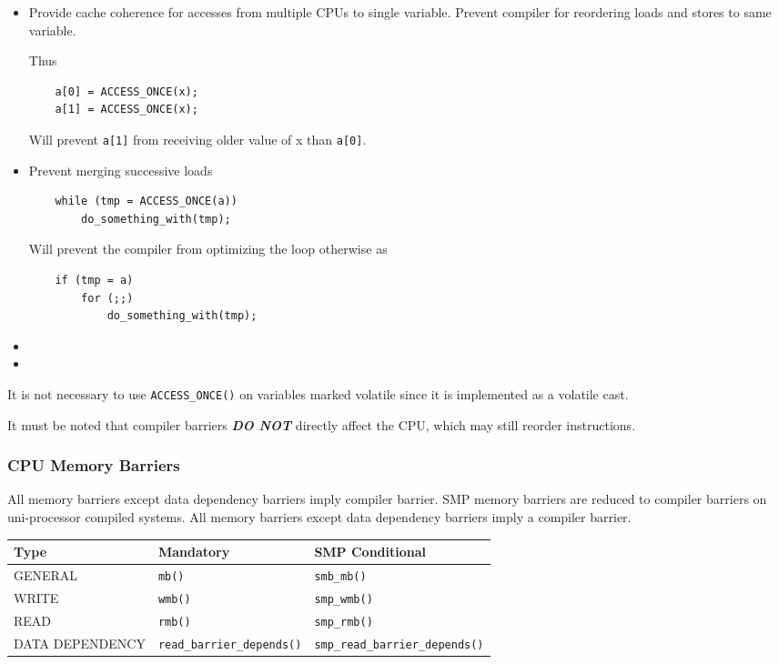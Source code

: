 \documentclass{article}
\begin{document}
\begin{itemize}
\item Provide cache coherence for accesses from multiple CPUs to
  single variable. Prevent compiler for reordering loads and stores to
  same variable.
  
  Thus
  \begin{lstlisting}
    a[0] = ACCESS_ONCE(x);
    a[1] = ACCESS_ONCE(x);
  \end{lstlisting}
  Will prevent \lstinline{a[1]} from receiving older value of x than
  \lstinline{a[0]}.

\item Prevent merging successive loads

  \begin{lstlisting}
    while (tmp = ACCESS_ONCE(a))
		do_something_with(tmp);
  \end{lstlisting}

  Will prevent the compiler from optimizing the loop otherwise as

  \begin{lstlisting}    
	if (tmp = a)
		for (;;)
			do_something_with(tmp);
  \end{lstlisting}

\item 
  
\item
\end{itemize}

It is not necessary to use \lstinline{ACCESS_ONCE()} on variables
marked volatile since it is implemented as a volatile cast.

It must be noted that compiler barriers \textbf{\emph{DO NOT}}
directly affect the CPU, which may still reorder instructions.


\subsubsection{CPU Memory Barriers}

All memory barriers except data dependency barriers imply compiler
barrier. SMP memory barriers are reduced to compiler barriers on
uni-processor compiled systems. All memory barriers except data
dependency barriers imply a compiler barrier.

\begin{center}
  \begin{tabular}{ l| l | l }    
    \hline
    Type & Mandatory & SMP Conditional \\ \hline
    GENERAL & \lstinline{mb()} & \lstinline{smb_mb()} \\ 
    WRITE & \lstinline{wmb()} & \lstinline{smp_wmb()}  \\ 
    READ &  \lstinline{rmb()} & \lstinline{smp_rmb()}  \\
    DATA DEPENDENCY &  \lstinline{read_barrier_depends()} & \lstinline{smp_read_barrier_depends()} \\
    \hline
  \end{tabular}
\end{center}
\end{document}
